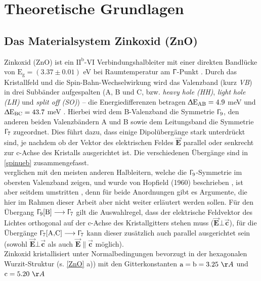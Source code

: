 \chapter{Theoretische Grundlagen} \section{Das Materialsystem Zinkoxid (ZnO)}
\label{ZnOMat} Zinkoxid (ZnO) ist ein $\text{II}^\text{b}$-VI
Verbindungshalbleiter mit einer direkten Bandlücke von  $\text{E}_\text{g}=
(\text{3.37} \pm \text{0.01})$ eV bei Raumtemperatur am $\Upgamma$-Punkt
\cite{Klingshirn.2010}. Durch das \mbox{Kristallfeld} und die
Spin-Bahn-Wechselwirkung wird das Valenzband (kurz \textit{VB}) in drei
\mbox{Subbänder} aufgespalten (A, B und C, bzw. \textit{heavy hole (HH)},
\textit{light hole (LH)} und \textit{split off (SO)}) – die Energiedifferenzen
betragen $\Updelta \text{E}_\text{AB}= \text{4.9}$ meV und $\Updelta
\text{E}_\text{BC}= \text{43.7}$ meV \cite{Klingshirn.2010}. Hierbei wird dem
B-Valenzband die Symmetrie $\Upgamma_\text{9}$, den anderen beiden
\mbox{Valenzbändern} A und B sowie dem Leitungsband die Symmetrie
$\Upgamma_\text{7}$ zugeordnet. Dies führt dazu, dass einige
\mbox{Dipolübergänge} stark unterdrückt sind, je nachdem ob der Vektor des
\mbox{elektrischen} \mbox{Feldes} $\vec{\textbf{E}}$ parallel oder senkrecht zur
c-Achse des Kristalls ausgerichtet ist. Die \mbox{verschiedenen} Übergänge sind
in \autoref{spinueb} zusammengefasst. \\ %
verglichen mit den meisten anderen Halbleitern, welche die
$\Upgamma_\text{9}$-Symmetrie im obersten Valenzband zeigen, und wurde von
Hopfield (1960) beschrieben \cite{Hopfield.1960}, ist aber seitdem umstritten
\cite{Park.1966}, denn für beide Anordnungen gibt es Argumente, die hier im
Rahmen dieser Arbeit aber nicht weiter erläutert werden sollen. Für den Übergang
$\Upgamma_\text{9}[\text{B}]\longrightarrow \Upgamma_\text{7}$ gilt die
Auswahlregel, dass der elektrische Feldvektor des Lichtes orthogonal auf der
c-Achse des Kristallgitters stehen muss ($\vec{\textbf{E}} \bot
\vec{\textbf{c}}$), für die Übergänge  $\Upgamma_\text{7}[\text{A,C}]
\longrightarrow \Upgamma_\text{7}$ kann dieser zusätzlich auch parallel
ausgerichtet sein (sowohl $\vec{\textbf{E}} \bot \vec{\textbf{c}}$ als auch
$\vec{\textbf{E}} \| \vec{\textbf{c}}$ möglich)\cite{Thomas.1962}.\\ Zinkoxid
kristallisiert unter Normalbedingungen bevorzugt in der hexagonalen
Wurzit-Struktur (s. \autoref{ZnO} a)) mit den Gitterkonstanten \mbox{$\text{a}=
\text{b} = \text{3.25 } \AA$} und $\text{c} = \text{5.20 } \AA$
